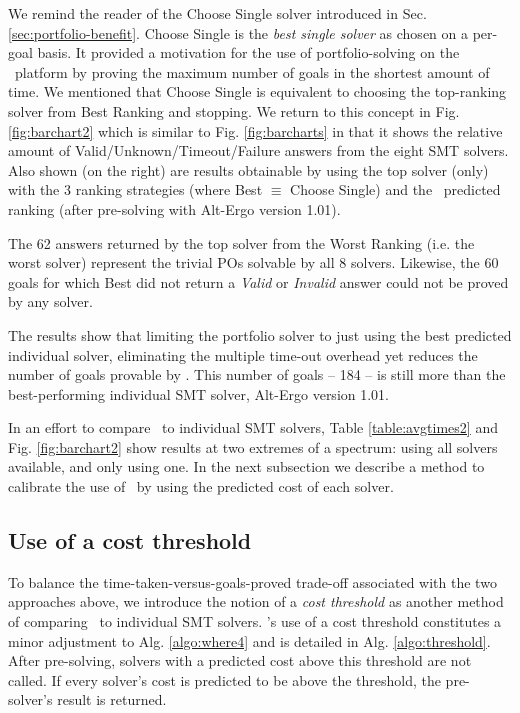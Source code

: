 We remind the reader of the \textsf{Choose Single} solver introduced in Sec. \ref{sec:portfolio-benefit}.
\textsf{Choose Single} is the \textit{best single solver} as chosen on a per-goal basis.
It provided a motivation for the use of portfolio-solving on the \why~platform by proving the maximum number of goals in the shortest amount of time.
We mentioned that \textsf{Choose Single} is equivalent to choosing  the top-ranking solver from \textsf{Best Ranking} and stopping.
We return to this concept in Fig. \ref{fig:barchart2} which is similar to Fig. \ref{fig:barcharts} in that it shows the relative amount of Valid/Unknown/Timeout/Failure answers from the eight SMT solvers. 
Also shown (on the right) are results obtainable by using the top solver (only) with the 3 ranking strategies (where \textsf{Best} $\equiv$ \textsf{Choose Single}) and the \where~predicted ranking (after pre-solving with Alt-Ergo version 1.01).

The 62  answers returned by the top solver from the \textsf{Worst Ranking} (i.e. the worst solver) represent the trivial POs solvable by all 8 solvers. 
Likewise, the 60 goals for which \textsf{Best} did not return a \textit{Valid} or \textit{Invalid} answer could not be proved by any solver.

The results show that limiting the portfolio solver to just using the best predicted individual solver, eliminating the multiple time-out overhead yet reduces the number of goals provable by \where.
This number of goals -- 184 -- is still more than the best-performing individual SMT solver, Alt-Ergo version 1.01.  

In an effort to compare \where~to individual SMT solvers, Table \ref{table:avgtimes2} and Fig. \ref{fig:barchart2} show results at two extremes of a spectrum: using all solvers available, and only using one.
In the next subsection we describe a method to calibrate the use of \where~by using the predicted cost of each solver. 


\subsection{Use of a cost threshold}

To balance the time-taken-versus-goals-proved trade-off associated with the two approaches above, we introduce the notion of a \textit{cost threshold} as another method of comparing \where~to individual SMT solvers.
\where's use of a cost threshold constitutes a minor adjustment to Alg. \ref{algo:where4} and is detailed in Alg. \ref{algo:threshold}. 
After pre-solving, solvers with a predicted cost above this threshold are not called. 
If every solver's cost is predicted to be above the threshold, the pre-solver's result is returned.

